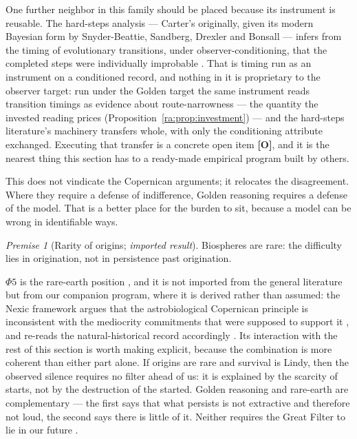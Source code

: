 \documentclass[11pt]{article}
\numberwithin{equation}{section}
\theoremstyle{plain}
\theoremstyle{definition}
\theoremstyle{remark}
\newtheorem{premise}{Premise}
\begin{document}
One further neighbor in this family should be placed because its
instrument is reusable. The hard-steps analysis --- Carter's
originally, given its modern Bayesian form by Snyder-Beattie,
Sandberg, Drexler and Bonsall --- infers from the timing of
evolutionary transitions, under observer-conditioning, that the
completed steps were individually improbable \cite{Car83, SBSD21}.
That is timing run as an instrument on a conditioned record, and
nothing in it is proprietary to the observer target: run under the
Golden target the same instrument reads transition timings as
evidence about route-narrowness --- the quantity the invested reading
prices (Proposition~\ref{ra:prop:investment}) --- and the hard-steps
literature's machinery transfers whole, with only the conditioning
attribute exchanged. Executing that transfer is a concrete open item
\textbf{[O]}, and it is the nearest thing this section has to a
ready-made empirical program built by others.

This does not vindicate the Copernican arguments; it relocates the
disagreement. Where they require a defense of indifference, Golden
reasoning requires a defense of the model. That is a better place for
the burden to sit, because a model can be wrong in identifiable ways.

\setcounter{premise}{4} %
\begin{premise}[Rarity of origins; \emph{imported result}]
\label{gr:phi5}
Biospheres are rare: the difficulty lies in origination, not in
persistence past origination.
\end{premise}

$\Phi5$ is the rare-earth position \cite{WB00}, and it is not imported
from the general literature but from our companion program,
where it is derived rather than assumed: the Nexic framework
\cite{Nexus} argues that the astrobiological Copernican principle
is inconsistent with the mediocrity commitments that were supposed to
support it \cite{Ben26Found}, and re-reads the natural-historical record
accordingly \cite{Ben26Optimal}. Its interaction with the rest of this
section is worth making explicit, because the combination is more
coherent than either part alone. If origins are rare and survival is
Lindy, then the observed silence requires no filter ahead of us: it is
explained by the scarcity of starts, not by the destruction of the
started. Golden reasoning and rare-earth are complementary --- the first
says that what persists is not extractive and therefore not loud, the
second says there is little of it. Neither requires the Great Filter to
lie in our future \cite{Han98,SDO18}.
\end{document}
